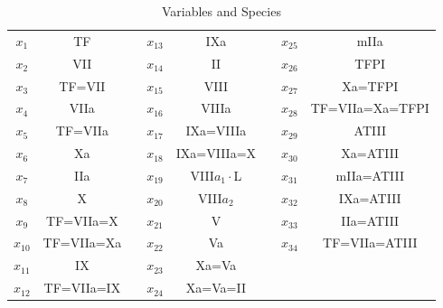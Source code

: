 \begin{table}
\begin{center}
\caption{ Variables and Species} \label{tabb} \vspace{3mm}
\begin{tabular}{|c|c|c|c|c|c|c|c|}\cline{1-2}
\cline{4-5}\cline{7-8} $x_{1}
$&TF&&$x_{13}$&IXa&&$x_{25}$&mIIa\\\cline{1-2}\cline{4-5}\cline{7-8}
$x_{2}
$&VII&&$x_{14}$&II&&$x_{26}$&TFPI\\\cline{1-2}\cline{4-5}\cline{7-8}
$x_{3}
$&TF=VII&&$x_{15}$&VIII&&$x_{27}$&Xa=TFPI\\\cline{1-2}\cline{4-5}\cline{7-8}
$x_{4} $&VIIa&&$x_{16}$&VIIIa&&$x_{28}$&TF=VIIa=Xa=TFPI\\\cline{1-2}\cline{4-5}\cline{7-8}
$x_{5}
$&TF=VIIa&&$x_{17}$&IXa=VIIIa&&$x_{29}$&ATIII\\\cline{1-2}\cline{4-5}\cline{7-8}
$x_{6}
$&Xa&&$x_{18}$&IXa=VIIIa=X&&$x_{30}$&Xa=ATIII\\\cline{1-2}\cline{4-5}\cline{7-8}
$x_{7}
$&IIa&&$x_{19}$&VIII$a_1\cdot$L&&$x_{31}$&mIIa=ATIII\\\cline{1-2}\cline{4-5}\cline{7-8}
$x_{8}
$&X&&$x_{20}$&VIII$a_2$&&$x_{32}$&IXa=ATIII\\\cline{1-2}\cline{4-5}\cline{7-8}
$x_{9}
$&TF=VIIa=X&&$x_{21}$&V&&$x_{33}$&IIa=ATIII\\\cline{1-2}\cline{4-5}\cline{7-8}
$x_{10}$&TF=VIIa=Xa&&$x_{22}$&Va&&$x_{34}$&TF=VIIa=ATIII\\\cline{1-2}\cline{4-5}\cline{7-8}
$x_{11}$&IX&&$x_{23}$&Xa=Va&&$
$&\\\cline{1-2}\cline{4-5}\cline{7-8}
$x_{12}$&TF=VIIa=IX&&$x_{24}$&Xa=Va=II&&$
$&\\\cline{1-2}\cline{4-5}\cline{7-8}
\end{tabular}
\end{center}
\end{table}

